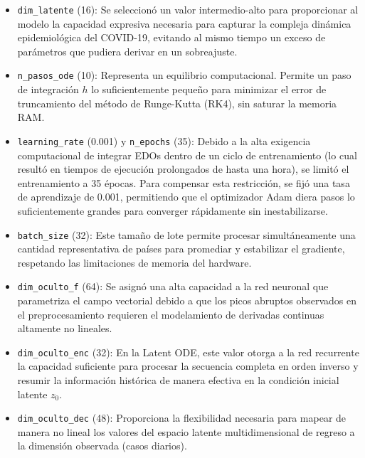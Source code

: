 \documentclass[12pt]{article}
\begin{document}
\begin{itemize}
\item \texttt{dim\_latente} (16): Se seleccionó un valor intermedio-alto para proporcionar al modelo la capacidad expresiva necesaria para capturar la compleja dinámica epidemiológica del COVID-19, evitando al mismo tiempo un exceso de parámetros que pudiera derivar en un sobreajuste.

\item \texttt{n\_pasos\_ode} (10): Representa un equilibrio computacional. Permite un paso de integración $h$ lo suficientemente pequeño para minimizar el error de truncamiento del método de Runge-Kutta (RK4), sin saturar la memoria RAM.

\item \texttt{learning\_rate} (0.001) y \texttt{n\_epochs} (35): Debido a la alta exigencia computacional de integrar EDOs dentro de un ciclo de entrenamiento (lo cual resultó en tiempos de ejecución prolongados de hasta una hora), se limitó el entrenamiento a 35 épocas. Para compensar esta restricción, se fijó una tasa de aprendizaje de 0.001, permitiendo que el optimizador Adam diera pasos lo suficientemente grandes para converger rápidamente sin inestabilizarse.

\item \texttt{batch\_size} (32): Este tamaño de lote permite procesar simultáneamente una cantidad representativa de países para promediar y estabilizar el gradiente, respetando las limitaciones de memoria del hardware.

\item \texttt{dim\_oculto\_f} (64): Se asignó una alta capacidad a la red neuronal que parametriza el campo vectorial debido a que los picos abruptos observados en el preprocesamiento requieren el modelamiento de derivadas continuas altamente no lineales.

\item \texttt{dim\_oculto\_enc} (32): En la Latent ODE, este valor otorga a la red recurrente la capacidad suficiente para procesar la secuencia completa en orden inverso y resumir la información histórica de manera efectiva en la condición inicial latente $z_0$.

\item \texttt{dim\_oculto\_dec} (48): Proporciona la flexibilidad necesaria para mapear de manera no lineal los valores del espacio latente multidimensional de regreso a la dimensión observada (casos diarios).
\end{itemize}
\end{document}

